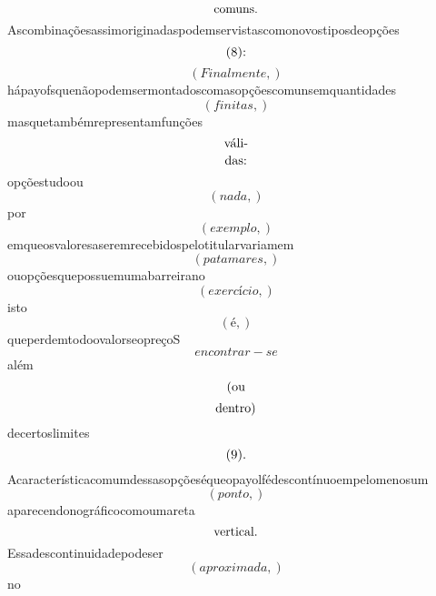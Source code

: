 \documentclass{article}
\begin{document}
\begin{equation}
$comuns.$
\end{equation}Ascombinaçõesassimoriginadaspodemservistascomonovostiposdeopções\begin{equation}
$(8):$
\end{equation}\begin{equation}
\left( Finalmente,\right)
\end{equation}hápayofsquenãopodemsermontadoscomasopçõescomunsemquantidades\begin{equation}
\left( finitas,\right)
\end{equation}masquetambémrepresentamfunções\begin{equation}
$váli-$
\end{equation}\begin{equation}
$das:$
\end{equation}opçõestudoou\begin{equation}
\left( nada,\right)
\end{equation}por\begin{equation}
\left( exemplo,\right)
\end{equation}emqueosvaloresaseremrecebidospelotitularvariamem\begin{equation}
\left( patamares,\right)
\end{equation}ouopçõesquepossuemumabarreirano\begin{equation}
\left( exercício,\right)
\end{equation}isto\begin{equation}
\left( é,\right)
\end{equation}queperdemtodoovalorseopreçoS\begin{equation}
encontrar - se
\end{equation}além\begin{equation}
$(ou$
\end{equation}\begin{equation}
$dentro)$
\end{equation}decertoslimites\begin{equation}
$(9).$
\end{equation}Acaracterísticacomumdessasopçõeséqueopayolfédescontínuoempelomenosum\begin{equation}
\left( ponto,\right)
\end{equation}aparecendonográficocomoumareta\begin{equation}
$vertical.$
\end{equation}Essadescontinuidadepodeser\begin{equation}
\left( aproximada,\right)
\end{equation}no\begin{equation}

\end{equation}
\end{document}

